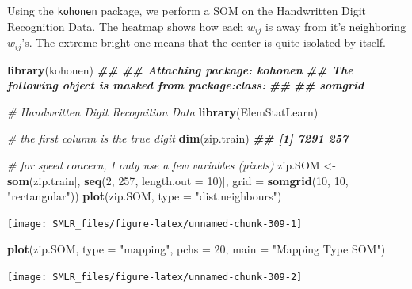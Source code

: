 \documentclass[
]{book}
\newenvironment{Shaded}{\begin{snugshade}}{\end{snugshade}}
\newcommand{\AttributeTok}[1]{\textcolor[rgb]{0.13,0.29,0.53}{#1}}
\newcommand{\CommentTok}[1]{\textcolor[rgb]{0.56,0.35,0.01}{\textit{#1}}}
\newcommand{\DecValTok}[1]{\textcolor[rgb]{0.00,0.00,0.81}{#1}}
\newcommand{\DocumentationTok}[1]{\textcolor[rgb]{0.56,0.35,0.01}{\textbf{\textit{#1}}}}
\newcommand{\FunctionTok}[1]{\textcolor[rgb]{0.13,0.29,0.53}{\textbf{#1}}}
\newcommand{\NormalTok}[1]{#1}
\newcommand{\OtherTok}[1]{\textcolor[rgb]{0.56,0.35,0.01}{#1}}
\newcommand{\StringTok}[1]{\textcolor[rgb]{0.31,0.60,0.02}{#1}}
\theoremstyle{definition}
\theoremstyle{definition}
\theoremstyle{definition}
\theoremstyle{definition}
\theoremstyle{remark}
\begin{document}
Using the \texttt{kohonen} package, we perform a SOM on the Handwritten Digit Recognition Data. The heatmap shows how each \(w_{ij}\) is away from it's neighboring \(w_{ij}\)'s. The extreme bright one means that the center is quite isolated by itself.

\begin{Shaded}
\begin{Highlighting}[]
  \FunctionTok{library}\NormalTok{(kohonen)}
\DocumentationTok{\#\# }
\DocumentationTok{\#\# Attaching package: \textquotesingle{}kohonen\textquotesingle{}}
\DocumentationTok{\#\# The following object is masked from \textquotesingle{}package:class\textquotesingle{}:}
\DocumentationTok{\#\# }
\DocumentationTok{\#\#     somgrid}

  \CommentTok{\# Handwritten Digit Recognition Data}
  \FunctionTok{library}\NormalTok{(ElemStatLearn)}

  \CommentTok{\# the first column is the true digit}
  \FunctionTok{dim}\NormalTok{(zip.train)}
\DocumentationTok{\#\# [1] 7291  257}
  
  \CommentTok{\# for speed concern, I only use a few variables (pixels)}
\NormalTok{  zip.SOM }\OtherTok{\textless{}{-}} \FunctionTok{som}\NormalTok{(zip.train[, }\FunctionTok{seq}\NormalTok{(}\DecValTok{2}\NormalTok{, }\DecValTok{257}\NormalTok{, }\AttributeTok{length.out =} \DecValTok{10}\NormalTok{)], }
                 \AttributeTok{grid =} \FunctionTok{somgrid}\NormalTok{(}\DecValTok{10}\NormalTok{, }\DecValTok{10}\NormalTok{, }\StringTok{"rectangular"}\NormalTok{))}
  \FunctionTok{plot}\NormalTok{(zip.SOM, }\AttributeTok{type =} \StringTok{"dist.neighbours"}\NormalTok{)}
\end{Highlighting}
\end{Shaded}

\begin{center}\texttt{[image: SMLR\_files/figure-latex/unnamed-chunk-309-1]} \end{center}

\begin{Shaded}
\begin{Highlighting}[]
  \FunctionTok{plot}\NormalTok{(zip.SOM, }\AttributeTok{type =} \StringTok{"mapping"}\NormalTok{, }\AttributeTok{pchs =} \DecValTok{20}\NormalTok{, }
       \AttributeTok{main =} \StringTok{"Mapping Type SOM"}\NormalTok{)}
\end{Highlighting}
\end{Shaded}

\begin{center}\texttt{[image: SMLR\_files/figure-latex/unnamed-chunk-309-2]} \end{center}
\end{document}
